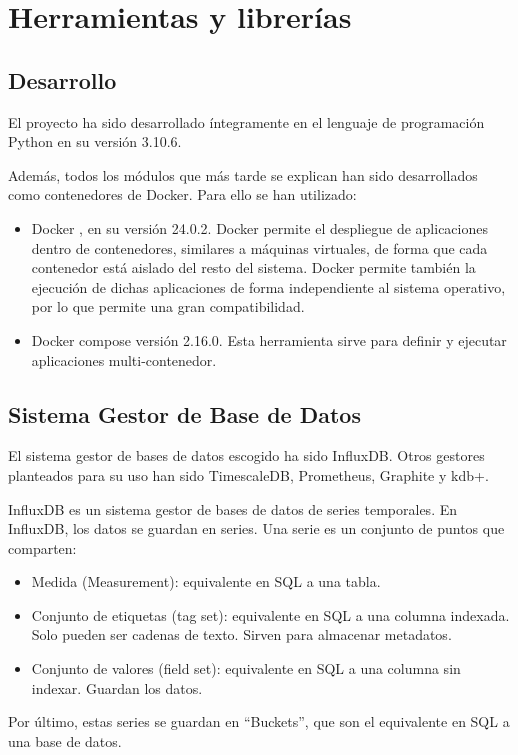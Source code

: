 \section{Herramientas y librerías}

\subsection{Desarrollo}

El proyecto ha sido desarrollado íntegramente en el lenguaje de programación Python en su versión 3.10.6.

Además, todos los módulos que más tarde se explican han sido desarrollados como contenedores de Docker. Para ello 
se han utilizado:
\begin{itemize}
    \item Docker \cite{docker-pag}, en su versión 24.0.2. Docker permite el despliegue de aplicaciones dentro de contenedores, similares
        a máquinas virtuales, de forma que cada contenedor está aislado del resto del sistema. Docker permite también
        la ejecución de dichas aplicaciones de forma independiente al sistema operativo, por lo que permite una gran 
        compatibilidad. 
    \item Docker compose \cite{compose} versión 2.16.0. Esta herramienta sirve para definir y ejecutar aplicaciones multi-contenedor.
\end{itemize}

\subsection{Sistema Gestor de Base de Datos}

El sistema gestor de bases de datos escogido ha sido InfluxDB. Otros gestores planteados para su uso han sido
TimescaleDB, Prometheus, Graphite y kdb+.

InfluxDB es un sistema gestor de bases de datos de series temporales. En InfluxDB, los datos se guardan en series. 
Una serie es un conjunto de puntos que comparten:
\begin{itemize}
    \item Medida (Measurement): equivalente en SQL a una tabla.
    \item Conjunto de etiquetas (tag set): equivalente en SQL a una columna indexada. Solo pueden ser cadenas de texto.
        Sirven para almacenar metadatos.
    \item Conjunto de valores (field set): equivalente en SQL a una columna sin indexar. Guardan los datos.
\end{itemize}
Por último, estas series se guardan en ``Buckets'', que son el equivalente en SQL a una base de datos.

